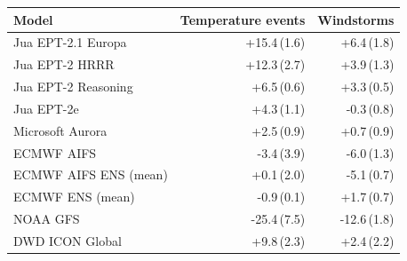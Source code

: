\begin{tabular}{@{}lrr@{}}
\toprule
Model & Temperature events & Windstorms \\
\midrule
Jua EPT-2.1 Europa & +15.4\,(1.6) & +6.4\,(1.8) \\\addlinespace[0.25em]
Jua EPT-2 HRRR & +12.3\,(2.7) & +3.9\,(1.3) \\\addlinespace[0.25em]
Jua EPT-2 Reasoning & +6.5\,(0.6) & +3.3\,(0.5) \\\addlinespace[0.25em]
Jua EPT-2e & +4.3\,(1.1) & -0.3\,(0.8) \\\addlinespace[0.25em]
Microsoft Aurora & +2.5\,(0.9) & +0.7\,(0.9) \\\addlinespace[0.25em]
ECMWF AIFS & -3.4\,(3.9) & -6.0\,(1.3) \\\addlinespace[0.25em]
ECMWF AIFS ENS (mean) & +0.1\,(2.0) & -5.1\,(0.7) \\\addlinespace[0.25em]
ECMWF ENS (mean) & -0.9\,(0.1) & +1.7\,(0.7) \\\addlinespace[0.25em]
NOAA GFS & -25.4\,(7.5) & -12.6\,(1.8) \\\addlinespace[0.25em]
DWD ICON Global & +9.8\,(2.3) & +2.4\,(2.2) \\
\bottomrule
\end{tabular}
